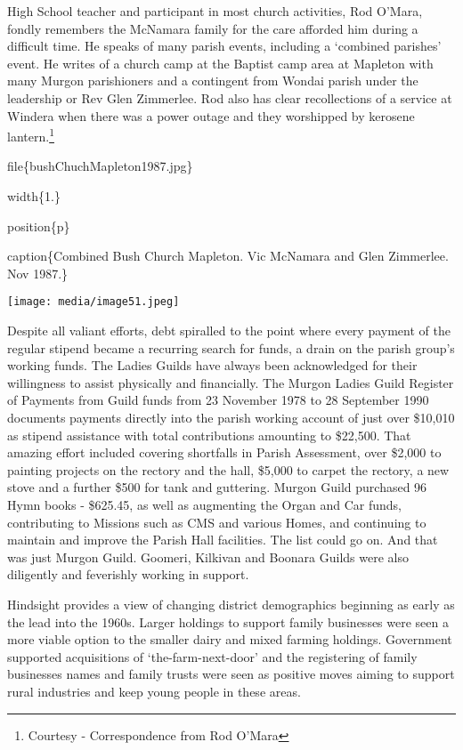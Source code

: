 High School teacher and participant in most church activities, Rod O'Mara, fondly remembers the McNamara family for the care afforded him during a difficult time. He speaks of many parish events, including a `combined parishes' event. He writes of a church camp at the Baptist camp area at Mapleton with many Murgon parishioners and a contingent from Wondai parish under the leadership or Rev Glen Zimmerlee. Rod also has clear recollections of a service at Windera when there was a power outage and they worshipped by kerosene lantern.\footnote{Courtesy - Correspondence from Rod O'Mara}

file\{bushChuchMapleton1987.jpg\}

width\{1.\}

position\{p\}

caption\{Combined Bush Church Mapleton. Vic McNamara and Glen Zimmerlee. Nov 1987.\}

\texttt{[image: media/image51.jpeg]}

Despite all valiant efforts, debt spiralled to the point where every payment of the regular stipend became a recurring search for funds, a drain on the parish group's working funds. The Ladies Guilds have always been acknowledged for their willingness to assist physically and financially. The Murgon Ladies Guild Register of Payments from Guild funds from 23 November 1978 to 28 September 1990 documents payments directly into the parish working account of just over \$10,010 as stipend assistance with total contributions amounting to \$22,500. That amazing effort included covering shortfalls in Parish Assessment, over \$2,000 to painting projects on the rectory and the hall, \$5,000 to carpet the rectory, a new stove and a further \$500 for tank and guttering. Murgon Guild purchased 96 Hymn books - \$625.45, as well as augmenting the Organ and Car funds, contributing to Missions such as CMS and various Homes, and continuing to maintain and improve the Parish Hall facilities. The list could go on. And that was just Murgon Guild. Goomeri, Kilkivan and Boonara Guilds were also diligently and feverishly working in support.

Hindsight provides a view of changing district demographics beginning as early as the lead into the 1960s. Larger holdings to support family businesses were seen a more viable option to the smaller dairy and mixed farming holdings. Government supported acquisitions of `the-farm-next-door' and the registering of family businesses names and family trusts were seen as positive moves aiming to support rural industries and keep young people in these areas.

